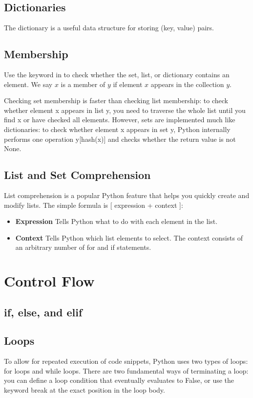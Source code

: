 \subsection{Dictionaries}
The dictionary is a useful data structure for storing \textsf{(key, value)} pairs.
\subsection{Membership}
Use the keyword \textsf{in} to check whether the set, list, or dictionary contains an element. We say $x$ is a member of $y$ if element $x$ appears in the collection $y$.

Checking set membership is faster than checking list membership: to check whether element x appears in list y, you need to traverse the whole list until you find x or have checked all elements. However, sets are implemented much like dictionaries: to check whether element x appears in set y, Python internally performs one operation \textsf{y[hash(x)]} and checks whether the return value is not None.

\subsection{List and Set Comprehension}
List comprehension is a popular Python feature that helps you quickly create and modify lists. The simple formula is \textsf{[ expression + context ]}:
\begin{itemize}
    \item \textbf{Expression} Tells Python what to do with each element in the list.
    \item \textbf{Context} Tells Python which list elements to select. The context consists of an arbitrary number of \textsf{for} and \textsf{if} statements.
\end{itemize}
\section{Control Flow}
\subsection{if, else, and elif}
\subsection{Loops}
To allow for repeated execution of code snippets, Python uses two types of loops: for loops and while loops. There are two fundamental ways of terminating a loop: you can define a loop condition that eventually evaluates to False, or use the keyword break at the exact position in the loop body.

